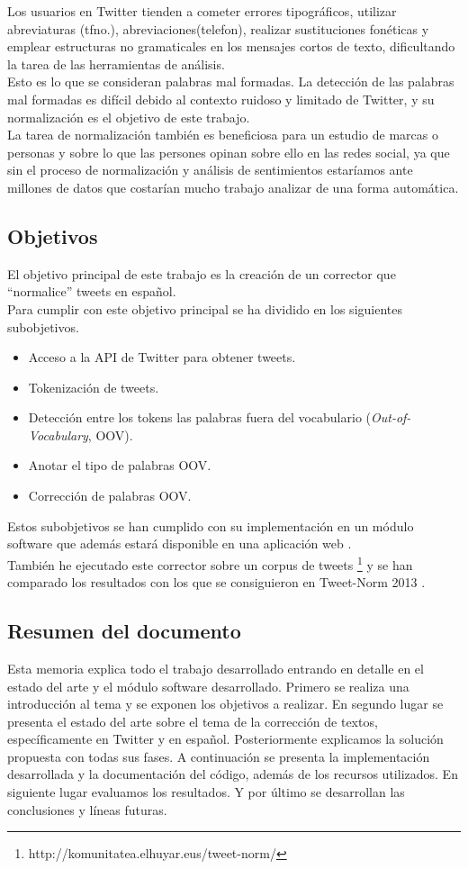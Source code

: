 \documentclass[spanish,12pt, a4paper,twoside]{paper}
\begin{document}
Los usuarios en Twitter tienden a cometer errores tipográficos, utilizar abreviaturas (tfno.), abreviaciones(telefon), realizar sustituciones fonéticas y emplear estructuras no gramaticales en los mensajes cortos de texto, dificultando la tarea de las herramientas de análisis. \\

Esto es lo que se consideran palabras mal formadas. La detección de las palabras mal formadas es difícil debido al contexto ruidoso y limitado de Twitter, y su normalización es el objetivo de este trabajo. \\

La tarea de normalización también es beneficiosa para un estudio de marcas o personas y sobre lo que las persones opinan sobre ello en las redes social, ya que sin el proceso de normalización y análisis de sentimientos estaríamos ante millones de datos que costarían mucho trabajo analizar de una forma automática.

\subsection{Objetivos}\label{sec:objetivos}
El objetivo principal de este trabajo es la creación de un corrector que ``normalice'' tweets en español.\\Para cumplir con este objetivo principal se ha dividido en los siguientes subobjetivos.
\begin{itemize}
\item Acceso a la API de Twitter para obtener tweets.
\item Tokenización de tweets.
\item Detección entre los tokens las palabras fuera del vocabulario (\textit{Out-of-Vocabulary}, OOV).
\item Anotar el tipo de palabras OOV.
\item Corrección de palabras OOV. 
\end{itemize}
Estos subobjetivos se han cumplido con su implementación en un módulo software que además estará disponible en una aplicación web \cite{tweetscweb}.\\

También he ejecutado este corrector sobre un corpus de tweets \footnote{http://komunitatea.elhuyar.eus/tweet-norm/} y se han comparado los resultados con los que se consiguieron en Tweet-Norm 2013 \cite{alegria:2013}.

\subsection{Resumen del documento}\label{sec:resumen}
Esta memoria explica todo el trabajo desarrollado entrando en detalle en el estado del arte y el  módulo software desarrollado. Primero se realiza una introducción al tema y se exponen los objetivos a realizar. En segundo lugar se presenta el estado del arte sobre el tema de la corrección de textos, específicamente en Twitter y en español. Posteriormente explicamos la solución propuesta con todas sus fases. A continuación se presenta la implementación desarrollada y la documentación del código, además de los recursos utilizados. En siguiente lugar evaluamos los resultados. Y por último se desarrollan las conclusiones y líneas futuras.
\end{document}
